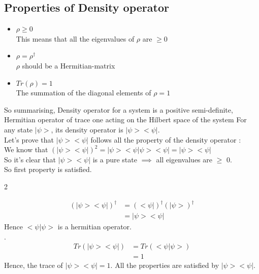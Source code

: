\documentclass{article}
\begin{document}
\subsection{Properties of Density operator}
\begin{itemize}
	\item \(\rho \geq 0\) \\
	      This means that all the eigenvalues of $\rho$ are $\geq 0$
	\item \(\rho = \rho^\dagger\) \\
	      $\rho$ should be a Hermitian-matrix
	\item $Tr(\rho) = 1$ \\
	      The summation of the diagonal elements of $\rho = 1$
\end{itemize}
So summarising, Density operator for a system is a positive semi-definite, Hermitian operator of trace one acting on the Hilbert space of the system
\newline \newline
For any state $|\psi>$, its density operator is $|\psi><\psi|$.\\
Let's prove that $|\psi><\psi|$ follows all the property of the density operator : \\
\newline
We know that $(|\psi><\psi|)^2 = |\psi><\psi|\psi><\psi| = |\psi><\psi|$ \\
So it's clear that $|\psi><\psi|$ is a pure state $\implies$ all eigenvalues are $\ge$ 0.\\ So first property is satisfied. \\
\begin{flushleft}2\end{flushleft}
\begin{align*}(|\psi><\psi|)^\dagger & = (<\psi|)^\dagger (|\psi>)^\dagger \\
	  & = |\psi><\psi| 
\end{align*}
Hence $<\psi|\psi>$ is a hermitian operator.\\
. \begin{align*}
Tr(|\psi><\psi|) & = Tr(<\psi|\psi>)  \tag*{(Trace Theorem)} \\
& =1
\end{align*}
Hence, the trace of $|\psi><\psi| = 1$.\newline
All the properties are satisfied by $|\psi><\psi|$.
\end{document}
